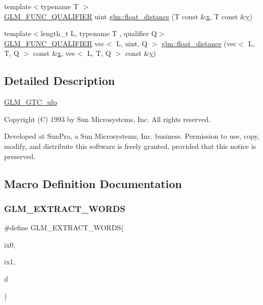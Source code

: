 \begin{DoxyCompactItemize}
\item 
{\footnotesize template$<$typename T $>$ }\\\mbox{\hyperlink{setup_8hpp_a33fdea6f91c5f834105f7415e2a64407}{G\+L\+M\+\_\+\+F\+U\+N\+C\+\_\+\+Q\+U\+A\+L\+I\+F\+I\+ER}} uint \mbox{\hyperlink{group__gtc__ulp_ga2e09bd6c8b0a9c91f6f5683d68245634}{glm\+::float\+\_\+distance}} (T const \&\mbox{\hyperlink{_s_d_l__opengl_8h_ad0e63d0edcdbd3d79554076bf309fd47}{x}}, T const \&\mbox{\hyperlink{_s_d_l__opengl_8h_a1675d9d7bb68e1657ff028643b4037e3}{y}})
\item 
{\footnotesize template$<$length\+\_\+t L, typename T , qualifier Q$>$ }\\\mbox{\hyperlink{setup_8hpp_a33fdea6f91c5f834105f7415e2a64407}{G\+L\+M\+\_\+\+F\+U\+N\+C\+\_\+\+Q\+U\+A\+L\+I\+F\+I\+ER}} vec$<$ L, uint, Q $>$ \mbox{\hyperlink{namespaceglm_a9fc26f96e81deb78db2dfb5d9e24e1e2}{glm\+::float\+\_\+distance}} (vec$<$ L, T, Q $>$ const \&\mbox{\hyperlink{_s_d_l__opengl_8h_ad0e63d0edcdbd3d79554076bf309fd47}{x}}, vec$<$ L, T, Q $>$ const \&\mbox{\hyperlink{_s_d_l__opengl_8h_a1675d9d7bb68e1657ff028643b4037e3}{y}})
\end{DoxyCompactItemize}


\subsection{Detailed Description}
\mbox{\hyperlink{group__gtc__ulp}{G\+L\+M\+\_\+\+G\+T\+C\+\_\+ulp}}

Copyright (C) 1993 by Sun Microsystems, Inc. All rights reserved.

Developed at Sun\+Pro, a Sun Microsystems, Inc. business. Permission to use, copy, modify, and distribute this software is freely granted, provided that this notice is preserved. 

\subsection{Macro Definition Documentation}
\mbox{\label{ulp_8inl_a037d712bb7eec79dcd0073eb07d3f3e8}} 
\subsubsection{\texorpdfstring{G\+L\+M\+\_\+\+E\+X\+T\+R\+A\+C\+T\+\_\+\+W\+O\+R\+DS}{GLM\_EXTRACT\_WORDS}}
{\footnotesize\ttfamily \#define G\+L\+M\+\_\+\+E\+X\+T\+R\+A\+C\+T\+\_\+\+W\+O\+R\+DS(\begin{DoxyParamCaption}\item[{}]{ix0,  }\item[{}]{ix1,  }\item[{}]{d }\end{DoxyParamCaption})}

